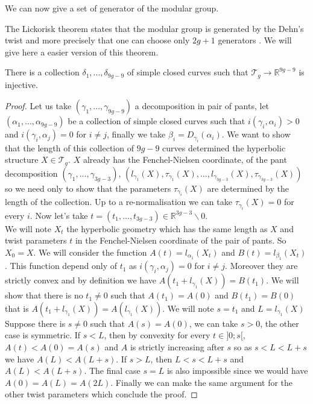 We can now give a set of generator of the modular group.

\begin{rmq}
The Lickorisk theorem states that the modular group is generated by the Dehn's twist and more precisely that one can choose only $2g+1$ generators \cite{Lickorish1964AFS}. We will give here a easier version of this theorem.
\end{rmq}

\begin{thm}
There is a collection $\delta_{1},...,\delta_{9g-9}$ of simple closed curves such that $\mathcal{T}_{g} \to \mathbb{R}^{9g-9}$ is injective.
\end{thm}

\begin{proof}
Let us take $(\gamma_1,...,\gamma_{9g-9})$ a decomposition in pair of pants, let $(\alpha_1,...,\alpha_{9g-9})$ be a collection of simple closed curves such that $i(\gamma_i,\alpha_i) > 0$ and $i(\gamma_i,\alpha_j)=0$ for $i \neq j$, finally we take $\beta_i=D_{\gamma_i}(\alpha_i)$. We want to show that the length of this collection of $9g-9$ curves determined the hyperbolic structure $X \in \mathcal{T}_g$.
$X$ already has the Fenchel-Nielsen coordinate, of the pant decomposition $(\gamma_1,...,\gamma_{3g-3})$, $(l_{\gamma_1}(X),\tau_{\gamma_1}(X),...,l_{\gamma_{3g-3}}(X),\tau_{\gamma_{3g-3}}(X))$ so we need only to show that the parameters $\tau_{\gamma_i}(X)$ are determined by the length of the collection. Up to a re-normalisation we can take $\tau_{\gamma_i}(X)=0$ for every $i$. Now let's take $t=(t_1,...,t_{3g-3}) \in \mathbb{R}^{3g-3} \backslash 0$.\\
We will note $X_t$ the hyperbolic geometry which has the same length as $X$ and twist parameters $t$ in the Fenchel-Nielsen coordinate of the pair of pants. So $X_0 = X$. We will consider the function $A(t)=l_{\alpha_1}(X_t)$ and $B(t)=l_{\beta_1}(X_t)$. This function depend only of $t_1$ as $i(\gamma_i,\alpha_j)=0$ for $i \neq j$. Moreover they are strictly convex and by definition we have $A(t_1+l_{\gamma_1}(X))= B(t_1)$. We will show that there is no $t_1 \neq 0$ such that $A(t_1)=A(0)$ and $B(t_1)=B(0)$ that is $A(t_1+l_{\gamma_1}(X))=A(l_{\gamma_1}(X))$. We will note $s=t_1$ and $L=l_{\gamma_1}(X)$
Suppose there is $s \neq 0$ such that $A(s)=A(0)$, we can take $s > 0$, the other case is symmetric. If $s < L$, then by convexity for every $t \in ]0;s[$, $A(t) < A(0)=A(s)$ and $A$ is strictly increasing after $s$ so as $s < L < L+s$ we have $A(L)< A(L+s)$.
If $s > L$, then $L < s < L+s$ and  $A(L) < A(L+s)$. The final case $s=L$ is also impossible since we would have $A(0)=A(L)=A(2L)$.
Finally we can make the same argument for the other twist parameters which conclude the proof.
\end{proof}

